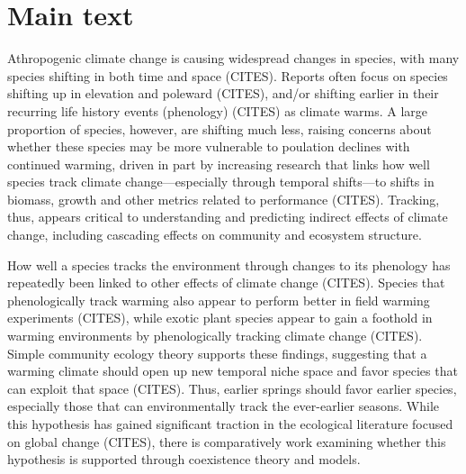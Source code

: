 \documentclass[11pt,letterpaper]{article}
\begin{document}
\section{Main text}
Athropogenic climate change is causing widespread changes in species, with many species shifting in both time and space (CITES). Reports often focus on species shifting up in elevation and poleward (CITES), and/or shifting earlier in their recurring life history events (phenology) (CITES) as climate warms. A large proportion of species, however, are shifting much less, raising concerns about whether these species may be more vulnerable to poulation declines with continued warming, driven in part by increasing research that links how well species track climate change---especially through temporal shifts---to shifts in biomass, growth and other metrics related to performance (CITES). Tracking, thus, appears critical to understanding and predicting indirect effects of climate change, including cascading effects on community and ecosystem structure.

How well a species tracks the environment through changes to its phenology has repeatedly been linked to other effects of climate change (CITES). Species that phenologically track warming also appear to perform better in field warming experiments (CITES), while exotic plant species appear to gain a foothold in warming environments by phenologically tracking climate change (CITES). Simple community ecology theory supports these findings, suggesting that a warming climate should open up new temporal niche space and favor species that can exploit that space (CITES). Thus, earlier springs should favor earlier species, especially those that can environmentally track the ever-earlier seasons. While this hypothesis has gained significant traction in the ecological literature focused on global change (CITES), there is comparatively work examining whether this hypothesis is supported through coexistence theory and models. \\
\end{document}
